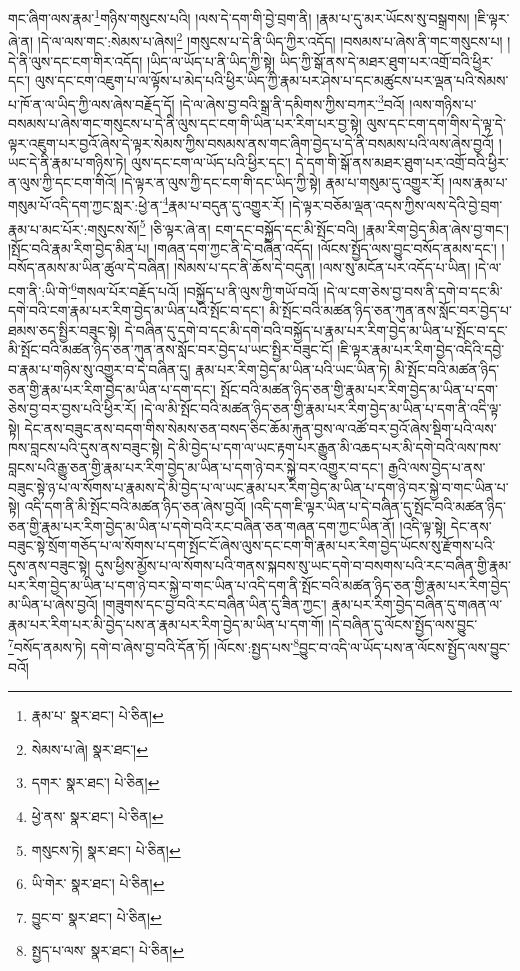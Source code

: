 གང་ཞིག་ལས་རྣམ་\footnote{རྣམ་པ་  སྣར་ཐང་།  པེ་ཅིན། }གཉིས་གསུངས་པའི། །ལས་དེ་དག་གི་བྱེ་བྲག་ནི། །རྣམ་པ་དུ་མར་ཡོངས་སུ་བསྒྲགས། །ཇི་ལྟར་ཞེ་ན། །དེ་ལ་ལས་གང་:སེམས་པ་ཞེས།\footnote{སེམས་པ་ཞེ།  སྣར་ཐང་། } །གསུངས་པ་དེ་ནི་ཡིད་ཀྱིར་འདོད། །བསམས་པ་ཞེས་ནི་གང་གསུངས་པ། །དེ་ནི་ལུས་དང་ངག་གིར་འདོད། །ཡིད་ལ་ཡོད་པ་ནི་ཡིད་ཀྱི་སྟེ། ཡིད་ཀྱི་སྒོ་ནས་དེ་མཐར་ཐུག་པར་འགྲོ་བའི་ཕྱིར་དང་། ལུས་དང་ངག་འཇུག་པ་ལ་ལྟོས་པ་མེད་པའི་ཕྱིར་ཡིད་ཀྱི་རྣམ་པར་ཤེས་པ་དང་མཚུངས་པར་ལྡན་པའི་སེམས་པ་ཁོ་ན་ལ་ཡིད་ཀྱི་ལས་ཞེས་བརྗོད་དོ། །དེ་ལ་ཞེས་བྱ་བའི་སྒྲ་ནི་དམིགས་ཀྱིས་བཀར་\footnote{དགར་  སྣར་ཐང་།  པེ་ཅིན། }བའོ། །ལས་གཉིས་པ་བསམས་པ་ཞེས་གང་གསུངས་པ་དེ་ནི་ལུས་དང་ངག་གི་ཡིན་པར་རིག་པར་བྱ་སྟེ། ལུས་དང་ངག་དག་གིས་དེ་ལྟ་དེ་ལྟར་འཇུག་པར་བྱའོ་ཞེས་དེ་ལྟར་སེམས་ཀྱིས་བསམས་ནས་གང་ཞིག་བྱེད་པ་དེ་ནི་བསམས་པའི་ལས་ཞེས་བྱའོ། །ཡང་དེ་ནི་རྣམ་པ་གཉིས་ཏེ། ལུས་དང་ངག་ལ་ཡོད་པའི་ཕྱིར་དང་། དེ་དག་གི་སྒོ་ནས་མཐར་ཐུག་པར་འགྲོ་བའི་ཕྱིར་ན་ལུས་ཀྱི་དང་ངག་གིའོ། །དེ་ལྟར་ན་ལུས་ཀྱི་དང་ངག་གི་དང་ཡིད་ཀྱི་སྟེ། རྣམ་པ་གསུམ་དུ་འགྱུར་རོ། །ལས་རྣམ་པ་གསུམ་པོ་འདི་དག་ཀྱང་སླར་:ཕྱེ་ན་\footnote{ཕྱེ་ནས་  སྣར་ཐང་།  པེ་ཅིན། }རྣམ་པ་བདུན་དུ་འགྱུར་རོ། །དེ་ལྟར་བཅོམ་ལྡན་འདས་ཀྱིས་ལས་དེའི་བྱེ་བྲག་རྣམ་པ་མང་པོར་:གསུངས་སོ།\footnote{གསུངས་ཏེ།  སྣར་ཐང་།  པེ་ཅིན། } །ཅི་ལྟར་ཞེ་ན། ངག་དང་བསྐྱོད་དང་མི་སྤོང་བའི། །རྣམ་རིག་བྱེད་མིན་ཞེས་བྱ་གང་། །སྤོང་བའི་རྣམ་རིག་བྱེད་མིན་པ། །གཞན་དག་ཀྱང་ནི་དེ་བཞིན་འདོད། །ལོངས་སྤྱོད་ལས་བྱུང་བསོད་ནམས་དང་། །བསོད་ནམས་མ་ཡིན་ཚུལ་དེ་བཞིན། །སེམས་པ་དང་ནི་ཆོས་དེ་བདུན། །ལས་སུ་མངོན་པར་འདོད་པ་ཡིན། །དེ་ལ་ངག་ནི་:ཡི་གེ་\footnote{ཡི་གེར་  སྣར་ཐང་།  པེ་ཅིན། }གསལ་པོར་བརྗོད་པའོ། །བསྐྱོད་པ་ནི་ལུས་ཀྱི་གཡོ་བའོ། །དེ་ལ་ངག་ཅེས་བྱ་བས་ནི་དགེ་བ་དང་མི་དགེ་བའི་ངག་རྣམ་པར་རིག་བྱེད་མ་ཡིན་པའི་སྤོང་བ་དང་། མི་སྤོང་བའི་མཚན་ཉིད་ཅན་ཀུན་ནས་སློང་བར་བྱེད་པ་ཐམས་ཅད་སྤྱིར་བཟུང་སྟེ། དེ་བཞིན་དུ་དགེ་བ་དང་མི་དགེ་བའི་བསྐྱོད་པ་རྣམ་པར་རིག་བྱེད་མ་ཡིན་པ་སྤོང་བ་དང་མི་སྤོང་བའི་མཚན་ཉིད་ཅན་ཀུན་ནས་སློང་བར་བྱེད་པ་ཡང་སྤྱིར་བཟུང་ངོ། །ཇི་ལྟར་རྣམ་པར་རིག་བྱེད་འདིའི་དབྱེ་བ་རྣམ་པ་གཉིས་སུ་འགྱུར་བ་དེ་བཞིན་དུ། རྣམ་པར་རིག་བྱེད་མ་ཡིན་པའི་ཡང་ཡིན་ཏེ། མི་སྤོང་བའི་མཚན་ཉིད་ཅན་གྱི་རྣམ་པར་རིག་བྱེད་མ་ཡིན་པ་དག་དང་། སྤོང་བའི་མཚན་ཉིད་ཅན་གྱི་རྣམ་པར་རིག་བྱེད་མ་ཡིན་པ་དག་ཅེས་བྱ་བར་བྱས་པའི་ཕྱིར་རོ། །དེ་ལ་མི་སྤོང་བའི་མཚན་ཉིད་ཅན་གྱི་རྣམ་པར་རིག་བྱེད་མ་ཡིན་པ་དག་ནི་འདི་ལྟ་སྟེ། དེང་ནས་བཟུང་ནས་བདག་གིས་སེམས་ཅན་བསད་ཅིང་ཆོམ་རྐུན་བྱས་ལ་འཚོ་བར་བྱའོ་ཞེས་སྡིག་པའི་ལས་ཁས་བླངས་པའི་དུས་ནས་བཟུང་སྟེ། དེ་མི་བྱེད་པ་དག་ལ་ཡང་རྟག་པར་རྒྱུན་མི་འཆད་པར་མི་དགེ་བའི་ལས་ཁས་བླངས་པའི་རྒྱུ་ཅན་གྱི་རྣམ་པར་རིག་བྱེད་མ་ཡིན་པ་དག་ཉེ་བར་སྐྱེ་བར་འགྱུར་བ་དང་། རྒྱའི་ལས་བྱེད་པ་ནས་བཟུང་སྟེ་ཉ་པ་ལ་སོགས་པ་རྣམས་དེ་མི་བྱེད་པ་ལ་ཡང་རྣམ་པར་རིག་བྱེད་མ་ཡིན་པ་དག་ཉེ་བར་སྐྱེ་བ་གང་ཡིན་པ་སྟེ། འདི་དག་ནི་མི་སྤོང་བའི་མཚན་ཉིད་ཅན་ཞེས་བྱའོ། །འདི་དག་ཇི་ལྟར་ཡིན་པ་དེ་བཞིན་དུ་སྤོང་བའི་མཚན་ཉིད་ཅན་གྱི་རྣམ་པར་རིག་བྱེད་མ་ཡིན་པ་དགེ་བའི་རང་བཞིན་ཅན་གཞན་དག་ཀྱང་ཡིན་ནོ། །འདི་ལྟ་སྟེ། དེང་ནས་བཟུང་སྟེ་སྲོག་གཅོད་པ་ལ་སོགས་པ་དག་སྤོང་ངོ་ཞེས་ལུས་དང་ངག་གི་རྣམ་པར་རིག་བྱེད་ཡོངས་སུ་རྫོགས་པའི་དུས་ནས་བཟུང་སྟེ། དུས་ཕྱིས་མྱོས་པ་ལ་སོགས་པའི་གནས་སྐབས་སུ་ཡང་དགེ་བ་བསགས་པའི་རང་བཞིན་གྱི་རྣམ་པར་རིག་བྱེད་མ་ཡིན་པ་དག་ཉེ་བར་སྐྱེ་བ་གང་ཡིན་པ་འདི་དག་ནི་སྤོང་བའི་མཚན་ཉིད་ཅན་གྱི་རྣམ་པར་རིག་བྱེད་མ་ཡིན་པ་ཞེས་བྱའོ། །གཟུགས་དང་བྱ་བའི་རང་བཞིན་ཡིན་དུ་ཟིན་ཀྱང་། རྣམ་པར་རིག་བྱེད་བཞིན་དུ་གཞན་ལ་རྣམ་པར་རིག་པར་མི་བྱེད་པས་ན་རྣམ་པར་རིག་བྱེད་མ་ཡིན་པ་དག་གོ། །དེ་བཞིན་དུ་ལོངས་སྤྱོད་ལས་བྱུང་\footnote{བྱུང་བ་  སྣར་ཐང་།  པེ་ཅིན། }བསོད་ནམས་ཏེ། དགེ་བ་ཞེས་བྱ་བའི་དོན་ཏོ། །ལོངས་:སྤྱད་པས་\footnote{སྤྱད་པ་ལས་  སྣར་ཐང་།  པེ་ཅིན། }བྱུང་བ་འདི་ལ་ཡོད་པས་ན་ལོངས་སྤྱོད་ལས་བྱུང་བའོ། 